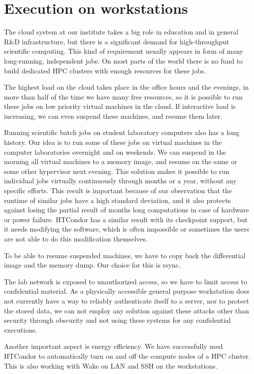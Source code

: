 \documentclass{llncs}
\begin{document}
   \section{Execution on workstations}
   The cloud system at our institute takes a big role in education and in general R{\&}D infrastructure, but there is a significant demand for high-throughput scientific computing. This  kind of requirement usually appears in form of many long-running, independent jobs. On most parts of the world there is no fund to build dedicated HPC clusters with enough resources for these jobs.

   The highest load on the cloud takes place in the office hours and the evenings, in more than half of the time we have many free resources, so it is possible to run these jobs on low priority virtual machines in the cloud. If interactive load is increasing, we can even suspend these machines, and resume them later.

   Running scientific batch jobs on student laboratory computers also has a long history. Our idea is to run some of these jobs on virtual machines in the computer laboratories overnight and on weekends. We can suspend in the morning all virtual machines to a memory image, and resume on the same or some other hypervisor next evening. This solution makes it possible to run individual jobs virtually continuously through months or a year, without any specific efforts. This result is important because of our observation that the runtime of similar jobs have a high standard deviation, and it also protects against losing the partial result of months long computations in case of hardware or power failure. HTCondor has a similar result with its checkpoint support, but it needs modifying the software, which is often impossible or sometimes the users are not able to do this modification themselves. 

   To be able to resume suspended machines, we have to copy back the differential image and the memory dump. Our choice for this is rsync.

   The lab network is exposed to unauthorized access, so we have to limit access to confidential material. As a physically accessible general purpose workstation does not currently have a way to reliably authenticate itself to a server, nor to protect the stored data, we can not employ any solution against these attacks other than security through obscurity and not using these systems for any confidential executions.

   Another important aspect is energy efficiency. We have successfully used HTCondor to automatically turn on and off the compute nodes of a HPC cluster. This is also working with Wake on LAN and SSH on the workstations.
\end{document}
